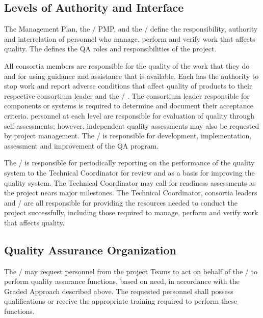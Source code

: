 \subsection{Levels of Authority and Interface}

The  Management Plan, the / PMP,
and the /  define the
responsibility, authority and interrelation of personnel who manage,
perform and verify work that affects quality. The  defines
the QA roles and responsibilities of the  project.

All consortia members are responsible for the quality of the work that
they do and for using guidance and assistance that is available. Each
has the authority to stop work and report adverse conditions that
affect quality of  products to their respective  consortium
leader and the / . The consortium leader responsible
for  components or systems is required to determine and document
their acceptance criteria.  personnel at each level are
responsible for evaluation of quality through self-assessments;
however, independent quality assessments may also be requested by
project management.  The /  is responsible for
development, implementation, assessment and improvement of the QA
program.

The /  is responsible for periodically reporting on
the performance of the quality system to the  Technical
Coordinator for review and as a basis for improving the
quality system. The  Technical Coordinator may call for  
readiness assessments as the project nears major
milestones. The  Technical Coordinator, consortia leaders and
/  are all responsible for providing the resources
needed to conduct the project successfully, including those required
to manage, perform and verify work that affects quality.

\subsection{Quality Assurance Organization}

The /  may request personnel from the  project
Teams to act on behalf of the /  to perform quality
assurance functions, based on need, in accordance with the Graded
Approach described above. The requested personnel shall possess
qualifications or receive the appropriate training required to perform
these functions.

